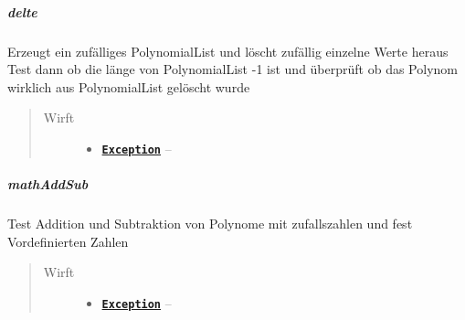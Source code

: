 \documentclass[letterpaper,10pt,ngerman]{sphinxmanual}
\begin{document}
\subparagraph{delte}
\label{com/linuxluigi/polynomial/PolynomialListTest:delte}

\begin{fulllineitems}
\label{com/linuxluigi/polynomial/PolynomialListTest:com.linuxluigi.polynomial.PolynomialListTest.delte()}
Erzeugt ein zufälliges PolynomialList und löscht zufällig einzelne Werte heraus Test dann ob die länge von PolynomialList -1 ist und überprüft ob das Polynom wirklich aus PolynomialList gelöscht wurde
\begin{quote}\begin{description}
\item[{Wirft}] \leavevmode\begin{itemize}
\item {} 
\href{http://docs.oracle.com/javase/6/docs/api/java/lang/Exception.html}{\textbf{\texttt{Exception}}} -- 

\end{itemize}

\end{description}\end{quote}

\end{fulllineitems}



\subparagraph{mathAddSub}
\label{com/linuxluigi/polynomial/PolynomialListTest:mathaddsub}

\begin{fulllineitems}
\label{com/linuxluigi/polynomial/PolynomialListTest:com.linuxluigi.polynomial.PolynomialListTest.mathAddSub()}
Test Addition und Subtraktion von Polynome mit zufallszahlen und fest Vordefinierten Zahlen
\begin{quote}\begin{description}
\item[{Wirft}] \leavevmode\begin{itemize}
\item {} 
\href{http://docs.oracle.com/javase/6/docs/api/java/lang/Exception.html}{\textbf{\texttt{Exception}}} -- 

\end{itemize}

\end{description}\end{quote}

\end{fulllineitems}
\end{document}
